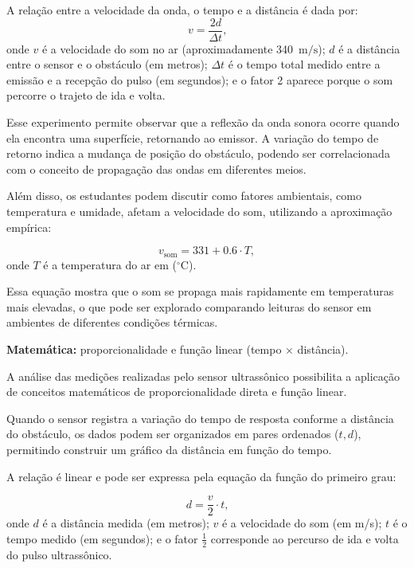 \documentclass[portuguese]{textolivre}
\begin{document}
A relação entre a velocidade da onda, o tempo e a distância é dada por:
\begin{equation}
	v = \frac{2d}{\Delta t} \text{,}
\end{equation}
onde $v$ é a velocidade do som no ar (aproximadamente 340~$\mathrm{m/s}$);
$d$ é a distância entre o sensor e o obstáculo (em metros);
$\Delta t$ é o tempo total medido entre a emissão e a recepção do pulso (em segundos); e o fator 2 aparece porque o som percorre o trajeto de ida e volta.

Esse experimento permite observar que a reflexão da onda sonora ocorre quando ela encontra uma superfície, retornando ao emissor. A variação do tempo de retorno indica a mudança de posição do obstáculo, podendo ser correlacionada com o conceito de propagação das ondas em diferentes meios.

Além disso, os estudantes podem discutir como fatores ambientais, como temperatura e umidade, afetam a velocidade do som, utilizando a aproximação empírica:

\begin{equation}
	v_{\text{som}} = 331 + 0.6 \cdot T ,
\end{equation}
onde $T$ é a temperatura do ar em ($^{\circ}\mathrm{C}$).

Essa equação mostra que o som se propaga mais rapidamente em temperaturas mais elevadas, o que pode ser explorado comparando leituras do sensor em ambientes de diferentes condições térmicas.

\textbf{Matemática:} proporcionalidade e função linear (tempo × distância).

A análise das medições realizadas pelo sensor ultrassônico possibilita a aplicação de conceitos matemáticos de proporcionalidade direta e função linear.

Quando o sensor registra a variação do tempo de resposta conforme a distância do obstáculo, os dados podem ser organizados em pares ordenados ($t, d$), permitindo construir um gráfico da distância em função do tempo.

A relação é linear e pode ser expressa pela equação da função do primeiro grau:

\begin{equation}
	d = \frac{v}{2} \cdot t \text{,}
\end{equation}
onde $d$ é a distância medida (em metros);
$v$ é a velocidade do som (em m/s);
$t$ é o tempo medido (em segundos); e
o fator $\frac{1}{2}$ corresponde ao percurso de ida e volta do pulso ultrassônico.
\end{document}
